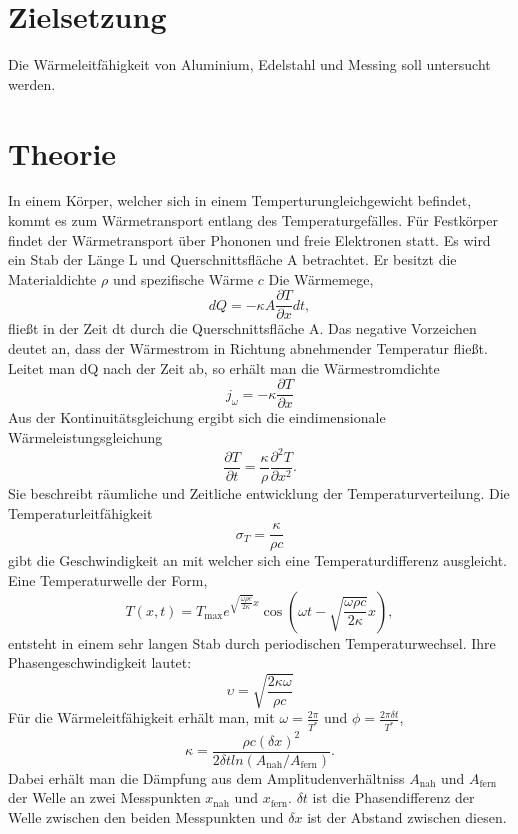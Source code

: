 \section{Zielsetzung}
Die Wärmeleitfähigkeit von Aluminium, Edelstahl und Messing soll untersucht werden.
\section{Theorie}
\label{sec:Theorie}
In einem Körper, welcher sich in einem Temperturungleichgewicht befindet, kommt es zum Wärmetransport entlang des Temperaturgefälles.
Für Festkörper findet der Wärmetransport über Phononen und freie Elektronen statt.
Es wird ein Stab der Länge L und Querschnittsfläche A betrachtet.
Er besitzt die Materialdichte $\rho$ und spezifische Wärme $c$
Die Wärmemege,
\begin{equation}
  dQ =-  \kappa A \frac{\partial T}{\partial x} dt ,
\end{equation}
fließt in der Zeit dt durch die Querschnittsfläche A.
Das negative Vorzeichen deutet an, dass der Wärmestrom in Richtung abnehmender Temperatur fließt.
Leitet man dQ nach der Zeit ab, so erhält man die Wärmestromdichte
\begin{equation}
 j_\omega =- \kappa \frac{\partial T}{\partial x}
\end{equation}
Aus der Kontinuitätsgleichung ergibt sich die eindimensionale Wärmeleistungsgleichung
\begin{equation}
  \frac{\partial T}{\partial t} = \frac {\kappa}{\rho} \frac{\partial^2  T}{\partial x^2} .
\end{equation}
Sie beschreibt räumliche und Zeitliche entwicklung der Temperaturverteilung.
Die Temperaturleitfähigkeit
\begin{equation}
  \sigma_T = \frac{\kappa}{\rho c}
\end{equation}
gibt die Geschwindigkeit an mit welcher sich eine Temperaturdifferenz ausgleicht.
\\
Eine Temperaturwelle der Form,
\begin{equation}
  T\left(x,t\right) = T_\text{max}e^{\sqrt{\frac{\omega\rho c}{2 \kappa}}x} \cos\left(\omega t - \sqrt{\frac{\omega\rho c}{2 
\kappa}}x\right) ,
\end{equation}
entsteht in einem sehr langen Stab durch periodischen Temperaturwechsel.
Ihre Phasengeschwindigkeit lautet:
\begin{equation}
  \upsilon = \sqrt{\frac{2\kappa\omega}{\rho c}}
\end{equation}
Für die Wärmeleitfähigkeit erhält man, mit  $\omega=\frac{2\pi}{T^*}$ und $\phi=\frac{2\pi\delta t}{T^*}$,
\begin{equation}
  \kappa = \frac{\rho c\left(\delta x\right)^2}{2\delta t ln\left(A_\text{nah}/A_\text{fern}\right)}  .
\end{equation}
Dabei erhält man die Dämpfung aus dem Amplitudenverhältniss $A_\text{nah}$ und $A_\text{fern}$ der Welle an zwei Messpunkten 
$x_\text{nah}$ und $x_\text{fern}$.
$\delta t$ ist die Phasendifferenz der Welle zwischen den beiden Messpunkten und $\delta x$ ist der Abstand zwischen diesen.
